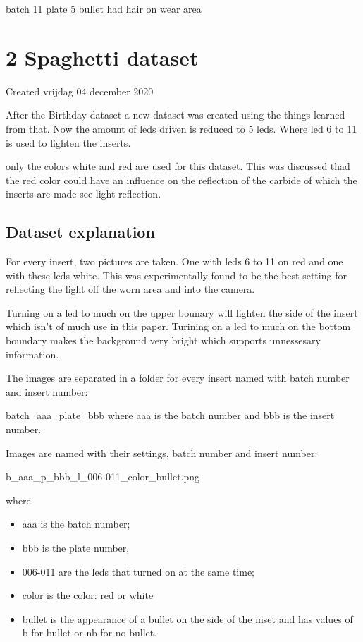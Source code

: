 \documentclass{article}
\begin{document}
batch 11 plate 5 bullet had hair on wear area


		\section{2 Spaghetti dataset}

Created vrijdag 04 december 2020



After the Birthday dataset a new dataset was created using the things learned from that. Now the amount of leds driven is reduced to 5 leds. Where led 6 to 11 is used to lighten the inserts. 

only the colors white and red are used for this dataset. This was discussed thad the red color could have an influence on the reflection of the carbide of which the inserts are made see light reflection.



\subsection{Dataset explanation}

For every insert, two pictures are taken. One with leds 6 to 11 on red and one with these leds white. This was experimentally found to be the best setting for reflecting the light off the worn area and into the camera. 

Turning on a led to much on the upper bounary will lighten the side of the insert which isn't of much use in this paper. Turining on a led to much on the bottom boundary makes the background very bright which supports unnessesary information.



The images are separated in a folder for every insert named with batch number and insert number:

batch\_aaa\_plate\_bbb where aaa is the batch number and bbb is the insert number.

Images are named with their settings, batch number and insert number:

b\_aaa\_p\_bbb\_l\_006-011\_color\_bullet.png 

where 

\begin{itemize}
\item aaa is the batch number; 
\item bbb is the plate number, 
\item 006-011 are the leds that turned on at the same time; 
\item color is the color: red or white
\item bullet is the appearance of a bullet on the side of the inset and has values of b for bullet or nb for no bullet.
\end{itemize}
\end{document}
